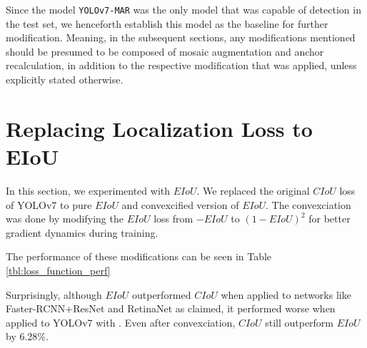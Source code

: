 Since the model \verb|YOLOv7-MAR| was the only model that was capable of detection in the test set,
we henceforth establish this model as the baseline for further modification. Meaning, in the subsequent
sections, any modifications mentioned should be presumed to be composed of mosaic augmentation and anchor recalculation,
in addition to the respective modification that was applied, unless explicitly stated otherwise.



\section{Replacing Localization Loss to EIoU}
In this section, we experimented with $EIoU$.
We replaced the original $CIoU$ loss of YOLOv7 to pure $EIoU$ and convexcified version of $EIoU$.
The convexciation was done by modifying the $EIoU$ loss from $-EIoU$ to $(1-EIoU)^2$ for better
gradient dynamics during training.

The performance of these modifications can be seen in Table \ref{tbl:loss_function_perf}

\begin{table}[H]
  \centering
  \label{tbl:loss_function_perf}
  \vspace{-1ex}
  
\end{table}

Surprisingly, although $EIoU$ outperformed $CIoU$ when applied to networks like Faster-RCNN+ResNet and RetinaNet
as \textcite{eiou} claimed, it performed worse when applied to YOLOv7 with \textcite{aot_dataset}.
Even after convexciation, $CIoU$ still outperform $EIoU$ by 6.28\%.

